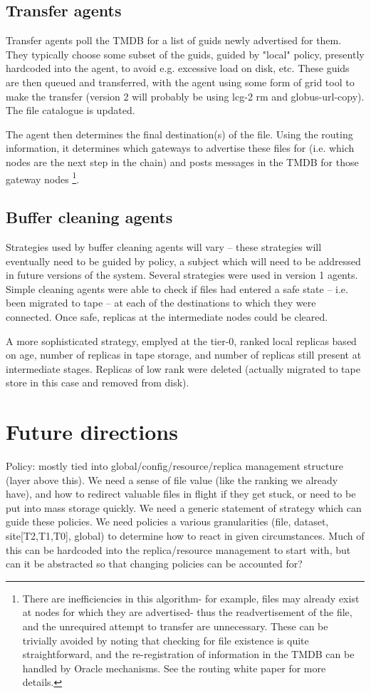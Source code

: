 \documentclass{cmspaper}
\begin{document}
\subsection{Transfer agents}
Transfer agents poll the TMDB for a list of guids newly advertised for them.  They typically choose some subset of the guids, guided by "local" policy, presently hardcoded into the agent, to avoid e.g. excessive load on disk, etc.  These guids are then queued and transferred, with the agent using some form of grid tool to make the transfer (version 2 will probably be using lcg-2 rm and globus-url-copy).  The file catalogue is updated.

The agent then determines the final destination(s) of the file.  Using the routing information, it determines which gateways to advertise these files for (i.e. which nodes are the next step in the chain) and posts messages in the TMDB for those gateway nodes \footnote{There are inefficiencies in this algorithm- for example, files may already exist at nodes for which they are advertised- thus the readvertisement of the file, and the unrequired attempt to transfer are unnecessary. These can be trivially avoided by noting that checking for file existence is quite straightforward, and the re-registration of information in the TMDB can be handled by Oracle mechanisms. See the routing white paper for more details.}.

\subsection{Buffer cleaning agents}
Strategies used by buffer cleaning agents will vary -- these strategies will eventually need to be guided by policy, a subject which will need to be addressed in future versions of the system.  Several strategies were used in version 1 agents.  Simple cleaning agents were able to check if files had entered a safe state -- i.e. been migrated to tape -- at each of the destinations to which they were connected.  Once safe, replicas at the intermediate nodes could be cleared.

A more sophisticated strategy, emplyed at the tier-0, ranked local replicas based on age, number of replicas in tape storage, and number of replicas still present at intermediate stages.  Replicas of low rank were deleted (actually migrated to tape store in this case and removed from disk).

\section{Future directions}
Policy: mostly tied into global/config/resource/replica management structure (layer above this).  We need a sense of file value (like the ranking we already have), and how to redirect valuable files in flight if they get stuck, or need to be put into mass storage quickly.  We need a generic statement of strategy which can guide these policies.  We need policies a various granularities (file, dataset, site[T2,T1,T0], global) to determine how to react in given circumstances.  Much of this can be hardcoded into the replica/resource management to start with, but can it be abstracted so that changing policies can be accounted for?
\end{document}
